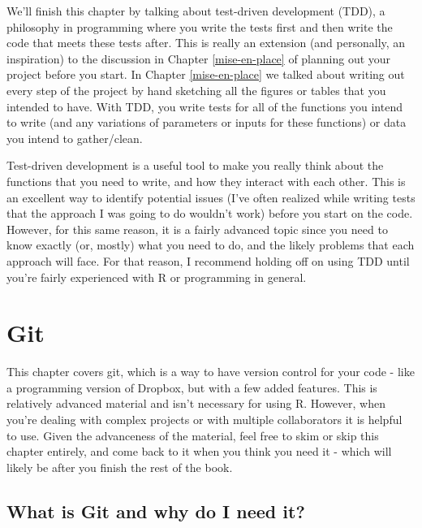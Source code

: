 \documentclass[
]{krantz}
\begin{document}
We'll finish this chapter by talking about test-driven development (TDD), a philosophy in programming where you write the tests first and then write the code that meets these tests after. This is really an extension (and personally, an inspiration) to the discussion in Chapter \ref{mise-en-place} of planning out your project before you start. In Chapter \ref{mise-en-place} we talked about writing out every step of the project by hand sketching all the figures or tables that you intended to have. With TDD, you write tests for all of the functions you intend to write (and any variations of parameters or inputs for these functions) or data you intend to gather/clean.

Test-driven development is a useful tool to make you really think about the functions that you need to write, and how they interact with each other. This is an excellent way to identify potential issues (I've often realized while writing tests that the approach I was going to do wouldn't work) before you start on the code. However, for this same reason, it is a fairly advanced topic since you need to know exactly (or, mostly) what you need to do, and the likely problems that each approach will face. For that reason, I recommend holding off on using TDD until you're fairly experienced with R or programming in general.

\hypertarget{git}{%
\chapter{Git}\label{git}}

This chapter covers git, which is a way to have version control for your code - like a programming version of Dropbox, but with a few added features. This is relatively advanced material and isn't necessary for using R. However, when you're dealing with complex projects or with multiple collaborators it is helpful to use. Given the advanceness of the material, feel free to skim or skip this chapter entirely, and come back to it when you think you need it - which will likely be after you finish the rest of the book.

\hypertarget{what-is-git-and-why-do-i-need-it}{%
\section{What is Git and why do I need it?}\label{what-is-git-and-why-do-i-need-it}}
\end{document}
